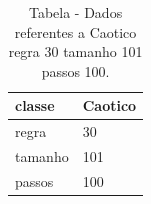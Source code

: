 \begin{table}[H]
\centering
\caption{Tabela - Dados referentes a Caotico regra 30 tamanho 101 passos 100.}
\label{tab:Caotico_regra_30_tamanho_101_passos_100}
\begin{tabular}{ll}
\toprule
classe & Caotico \\
\midrule
regra & 30 \\
tamanho & 101 \\
passos & 100 \\
\bottomrule
\end{tabular}

\end{table}
